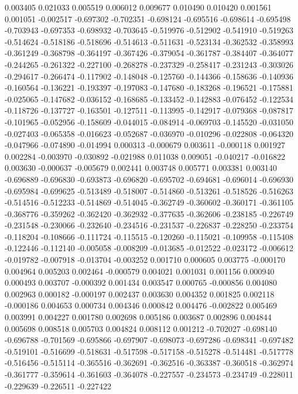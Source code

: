 0.003405
0.021033
0.005519
0.006012
0.009677
0.010490
0.010420
0.001561
0.001051
-0.002517
-0.697302
-0.702351
-0.698124
-0.695516
-0.698614
-0.695498
-0.703943
-0.697353
-0.698932
-0.703645
-0.519976
-0.512902
-0.541910
-0.519263
-0.514624
-0.518186
-0.518696
-0.514613
-0.511631
-0.523134
-0.362532
-0.358993
-0.361249
-0.368798
-0.364197
-0.367426
-0.379054
-0.361787
-0.384407
-0.364077
-0.244265
-0.261322
-0.227100
-0.268278
-0.237329
-0.258417
-0.231243
-0.303026
-0.294617
-0.266474
-0.117902
-0.148048
-0.125760
-0.144366
-0.158636
-0.140936
-0.160564
-0.136221
-0.193397
-0.197083
-0.147680
-0.183268
-0.196521
-0.175881
-0.025065
-0.147682
-0.036152
-0.168685
-0.133452
-0.142883
-0.076452
-0.122534
-0.118726
-0.137727
-0.163501
-0.127511
-0.113995
-0.142917
-0.079368
-0.087817
-0.101965
-0.052956
-0.158609
-0.044015
-0.084914
-0.069703
-0.145520
-0.031050
-0.027403
-0.065358
-0.016623
-0.052687
-0.036970
-0.010296
-0.022808
-0.064320
-0.047966
-0.074890
-0.014994
0.000313
-0.000679
0.003611
-0.000118
0.001927
0.002284
-0.003970
-0.030892
-0.021988
0.011038
0.009051
-0.040217
-0.016822
0.003630
-0.000637
-0.005679
0.002441
0.003748
0.005771
0.003381
0.003140
-0.696889
-0.696830
-0.693873
-0.696820
-0.695702
-0.694681
-0.696014
-0.696930
-0.695984
-0.699625
-0.513489
-0.518007
-0.514860
-0.513261
-0.518526
-0.516263
-0.514516
-0.512233
-0.514869
-0.514045
-0.362749
-0.360602
-0.360171
-0.361105
-0.368776
-0.359262
-0.362420
-0.362932
-0.377635
-0.362606
-0.238185
-0.226749
-0.231548
-0.230066
-0.232640
-0.234516
-0.231537
-0.226837
-0.228250
-0.233754
-0.118204
-0.108666
-0.111724
-0.115515
-0.120260
-0.115021
-0.109958
-0.115408
-0.122446
-0.112140
-0.005058
-0.008209
-0.013685
-0.012522
-0.023172
-0.006612
-0.019782
-0.007918
-0.013704
-0.003252
0.001710
0.000605
0.003775
-0.000170
0.004964
0.005203
0.002464
-0.000579
0.004021
0.001031
0.001156
0.000940
0.000493
0.003707
-0.000392
0.001434
0.003547
0.000765
-0.000856
0.004080
0.002963
0.000182
-0.000197
0.002437
0.003630
0.004352
0.001825
0.002118
-0.000186
0.004653
0.000734
0.004346
0.000842
0.004476
-0.002822
0.005469
0.003991
0.004227
0.001780
0.002698
0.005186
0.003687
0.002896
0.004844
0.005698
0.008518
0.005703
0.004824
0.008112
0.001212
-0.702027
-0.698140
-0.696788
-0.701569
-0.695866
-0.697907
-0.698073
-0.697286
-0.698341
-0.697482
-0.519101
-0.516699
-0.518631
-0.517598
-0.517158
-0.515278
-0.514481
-0.517778
-0.516456
-0.515114
-0.365516
-0.362691
-0.362516
-0.363387
-0.360518
-0.362974
-0.361777
-0.359614
-0.361603
-0.364078
-0.227557
-0.234573
-0.234749
-0.228011
-0.229639
-0.226511
-0.227422
